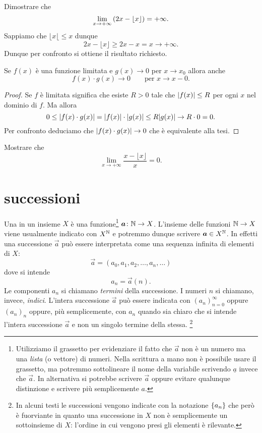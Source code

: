 \begin{example}
  Dimostrare che 
  \[
    \lim_{x\to +\infty} {\left( 2x - \lfloor x\rfloor \right)} = +\infty. 
  \]
  Sappiamo che $\lfloor x\lfloor \le x$ dunque 
  \[
    2x - \lfloor x \rfloor \ge 2x -x = x \to +\infty.  
  \]
  Dunque per confronto si ottiene il risultato richiesto.
\end{example}

\begin{corollary}%
\label{cor:limitata_per_infinitesima}%
\mymark{**}%
  Se $f(x)$ è una funzione limitata e $g(x)\to 0$ per 
  $x\to x_0$ allora anche
  \[
    f(x)\cdot g(x) \to 0 \qquad \text{per $x\to x-0.$} 
  \]
\end{corollary}
%
\begin{proof}
  Se $f$ è limitata significa che esiste $R>0$ tale che ${\left|f(x)\right|}\le R$
  per ogni $x$ nel dominio di $f$.
  Ma allora 
  \[
     0\le {\left|f(x)\cdot g(x)\right|} = {\left|f(x)\right|}\cdot {\left|g(x)\right|} 
     \le R {\left|g(x)\right|} \to R\cdot 0 = 0.
  \]
  Per confronto deduciamo che ${\left|f(x)\cdot g(x)\right|}\to 0$ 
  che è equivalente alla tesi.
\end{proof}

\begin{exercise}
  Mostrare che 
  \[
   \lim_{x\to +\infty} \frac{x-\lfloor x \rfloor}{x} = 0.  
  \]
\end{exercise}
%

\section{successioni}
\label{ch:successioni}

Una  in un insieme $X$ è una
funzione\footnote{%
Utilizziamo il grassetto per evidenziare il fatto
che $\vec a$ non è un numero ma una \emph{lista} (o vettore) di numeri.
Nella scrittura a mano non è possibile usare il grassetto, ma potremmo
sottolineare il nome della variabile scrivendo $\underline a$ invece che $\vec a$.
In alternativa si potrebbe scrivere $\stackrel{\rightarrow}a$ oppure evitare
qualunque distinzione e scrivere più semplicemente $a$.}
$\boldsymbol a\colon \mathbb N \to X$.
L'insieme delle funzioni $\mathbb N \to X$ viene usualmente indicato
con $X^\mathbb N$ e potremmo dunque scrivere $\boldsymbol a \in X^\mathbb N$. In effetti una successione $\vec a$ può essere interpretata
come una sequenza infinita di elementi di $X$:
\[
  \vec a = (a_0, a_1, a_2, \dots, a_n, \dots )
\]
dove si intende
\[
   a_n = \vec a(n).
\]
Le componenti $a_n$ si chiamano \emph{termini} della successione.
I numeri $n$ si chiamano, invece, \emph{indici}.
L'intera
successione $\vec a$ può essere indicata con $(a_n)_{n=0}^\infty$
oppure $(a_n)_n$ oppure,
più semplicemente, con $a_n$ quando sia chiaro che si intende l'intera
successione $\vec a$ e non un singolo termine della stessa.%
\footnote{In alcuni testi le successioni vengono indicate
con la notazione ${\left\{ a_n \right\}}$ che però è fuorviante in quanto
una successione in $X$ non è semplicemente un sottoinsieme di $X$:
l'ordine in cui vengono presi gli elementi è rilevante.}

